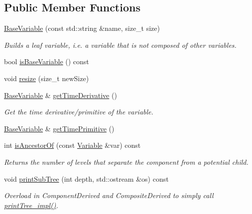 \subsection*{Public Member Functions}
\begin{DoxyCompactItemize}
\item 
\hyperlink{classocra_1_1BaseVariable_ae86fd20357d1b333c73d22b7a9a010f6}{Base\+Variable} (const std\+::string \&name, size\+\_\+t size)
\begin{DoxyCompactList}\small\item\em Builds a leaf variable, i.\+e. a variable that is not composed of other variables. \end{DoxyCompactList}\item 
bool \hyperlink{classocra_1_1BaseVariable_a454556cfc20026911bc687bc481ec95b}{is\+Base\+Variable} () const
\item 
void \hyperlink{classocra_1_1BaseVariable_a5d473eeb113e4751c27cf6af7af62919}{resize} (size\+\_\+t new\+Size)
\item 
\hyperlink{classocra_1_1BaseVariable}{Base\+Variable} \& \hyperlink{classocra_1_1BaseVariable_a79a86d7415d8b460ad9f526f685961dc}{get\+Time\+Derivative} ()
\begin{DoxyCompactList}\small\item\em Get the time derivative/primitive of the variable. \end{DoxyCompactList}\item 
\hyperlink{classocra_1_1BaseVariable}{Base\+Variable} \& \hyperlink{classocra_1_1BaseVariable_aa985b0703fc0a2edcd66a7c4c4ee05e4}{get\+Time\+Primitive} ()
\item 
int \hyperlink{classocra_1_1BaseVariable_a66d07236f4d060273f3f46632dc851ac}{is\+Ancestor\+Of} (const \hyperlink{classocra_1_1Variable}{Variable} \&var) const
\begin{DoxyCompactList}\small\item\em Returns the number of levels that separate the component from a potential child. \end{DoxyCompactList}\item 
void \hyperlink{classocra_1_1BaseVariable_a4058b1accad9ff7b3d8995bdf9285fbd}{print\+Sub\+Tree} (int depth, std\+::ostream \&os) const
\begin{DoxyCompactList}\small\item\em Overload in Component\+Derived and Composite\+Derived to simply call \hyperlink{classocra_1_1Leaf_aaf46f5b8cd9d9667b8080898b1d9138a}{print\+Tree\+\_\+impl()}. \end{DoxyCompactList}\end{DoxyCompactItemize}
